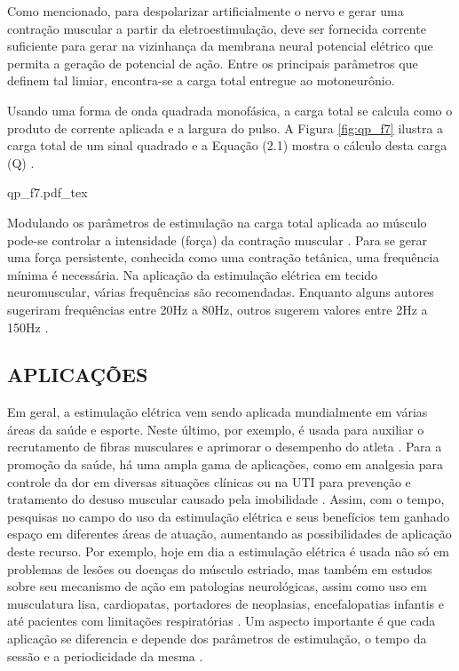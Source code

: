 Como mencionado, para despolarizar artificialmente o nervo e gerar uma contração muscular a partir da eletroestimulação, deve ser fornecida corrente suficiente para gerar na vizinhança da membrana neural potencial elétrico que permita a geração de potencial de ação. Entre os principais parâmetros que definem tal limiar, encontra-se a carga total entregue ao motoneurônio.

\vspace{1cm}
Usando uma forma de onda quadrada monofásica, a carga total se calcula como o produto de corrente aplicada e a largura do pulso. A Figura \ref{fig:qp_f7} ilustra a carga total de um sinal quadrado e a Equação (2.1) mostra o cálculo desta carga (Q) \cite{Robinson2002}.

\vspace{0.3cm}
\begin{figure*}[h]
    \centering %
    \small %
    \def\svgwidth{0.5\columnwidth}%
    {qp_f7.pdf_tex}
    \caption{Carga total (Q), intensidade aplicada (Ia) e largura de pulso (Lp).}
    \label{fig:qp_f7}
\end{figure*}



Modulando os parâmetros de estimulação na carga total aplicada ao músculo pode-se controlar a intensidade (força) da contração muscular \cite{Maffiuletti2010}. Para se gerar uma força persistente, conhecida como uma contração tetânica, uma frequência mínima é necessária. Na aplicação da estimulação elétrica em tecido neuromuscular, várias frequências são recomendadas. Enquanto alguns autores sugeriram frequências entre 20Hz a 80Hz, outros sugerem valores entre 2Hz a 150Hz \cite{Kitchen2003a, Delitto1988a}.


\subsection{APLICAÇÕES}
Em geral, a estimulação elétrica vem sendo aplicada mundialmente em várias áreas da saúde e esporte. Neste último, por exemplo, é usada para auxiliar o recrutamento de fibras musculares e aprimorar o desempenho do atleta \cite{Garcia2001}. Para a promoção da saúde, há uma ampla gama de aplicações, como em analgesia para controle da dor em diversas situações clínicas \cite{Sterin1966} ou na \acrshort{UTI} para prevenção e tratamento do desuso muscular causado pela imobilidade \cite{Fernando2017}. Assim, com o tempo, pesquisas no campo do uso da estimulação elétrica e seus benefícios tem ganhado espaço em diferentes áreas de atuação, aumentando as possibilidades de aplicação deste recurso. Por exemplo, hoje em dia a estimulação elétrica é usada não só em problemas de lesões ou doenças do músculo estriado, mas também em estudos sobre seu mecanismo de ação em patologias neurológicas, assim como uso em musculatura lisa, cardiopatas, portadores de neoplasias, encefalopatias infantis e até pacientes com limitações respiratórias \cite{Paulo2007, Sterin1966}. Um aspecto importante é que cada aplicação se diferencia e depende dos parâmetros de estimulação, o tempo da sessão e a periodicidade da mesma \cite{Crepon2008, Naki2011, Robinson2002}.

